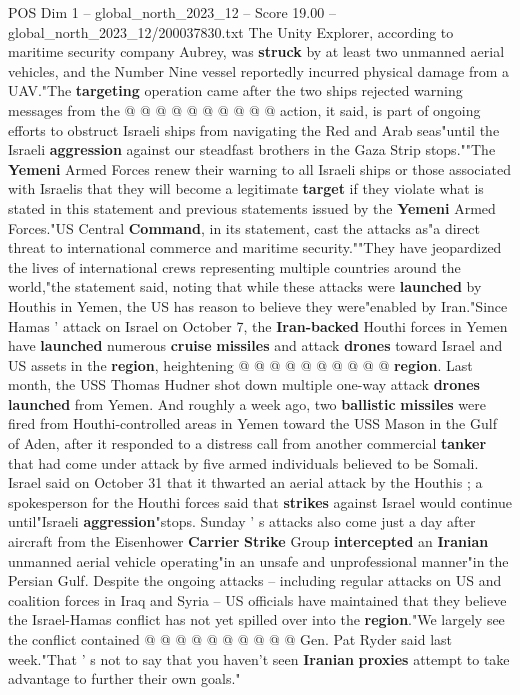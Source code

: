 \begin{textsample}{POS Dim 1 – global\_north\_2023\_12 – Score 19.00 – global\_north\_2023\_12/200037830.txt}
The Unity Explorer, according to maritime security company Aubrey, was \textbf{struck} by at least two unmanned aerial vehicles, and the Number Nine vessel reportedly incurred physical damage from a UAV."The \textbf{targeting} operation came after the two ships rejected warning messages from the @ @ @ @ @ @ @ @ @ @ action, it said, is part of ongoing efforts to obstruct Israeli ships from navigating the Red and Arab seas"until the Israeli \textbf{aggression} against our steadfast brothers in the Gaza Strip stops.""The \textbf{Yemeni} Armed Forces renew their warning to all Israeli ships or those associated with Israelis that they will become a legitimate \textbf{target} if they violate what is stated in this statement and previous statements issued by the \textbf{Yemeni} Armed Forces."US Central \textbf{Command}, in its statement, cast the attacks as"a direct threat to international commerce and maritime security.""They have jeopardized the lives of international crews representing multiple countries around the world,"the statement said, noting that while these attacks were \textbf{launched} by Houthis in Yemen, the US has reason to believe they were"enabled by Iran."Since Hamas ' attack on Israel on October 7, the \textbf{Iran-backed} Houthi forces in Yemen have \textbf{launched} numerous \textbf{cruise} \textbf{missiles} and attack \textbf{drones} toward Israel and US assets in the \textbf{region}, heightening @ @ @ @ @ @ @ @ @ @ \textbf{region}.
Last month, the USS Thomas Hudner shot down multiple one-way attack \textbf{drones} \textbf{launched} from Yemen.
And roughly a week ago, two \textbf{ballistic} \textbf{missiles} were fired from Houthi-controlled areas in Yemen toward the USS Mason in the Gulf of Aden, after it responded to a distress call from another commercial \textbf{tanker} that had come under attack by five armed individuals believed to be Somali.
Israel said on October 31 that it thwarted an aerial attack by the Houthis ; a spokesperson for the Houthi forces said that \textbf{strikes} against Israel would continue until"Israeli \textbf{aggression}"stops.
Sunday ' s attacks also come just a day after aircraft from the Eisenhower \textbf{Carrier} \textbf{Strike} Group \textbf{intercepted} an \textbf{Iranian} unmanned aerial vehicle operating"in an unsafe and unprofessional manner"in the Persian Gulf.
Despite the ongoing attacks -- including regular attacks on US and coalition forces in Iraq and Syria -- US officials have maintained that they believe the Israel-Hamas conflict has not yet spilled over into the \textbf{region}."We largely see the conflict contained @ @ @ @ @ @ @ @ @ @ Gen.
Pat Ryder said last week."That ' s not to say that you haven't seen \textbf{Iranian} \textbf{proxies} attempt to take advantage to further their own goals."

\end{textsample}
